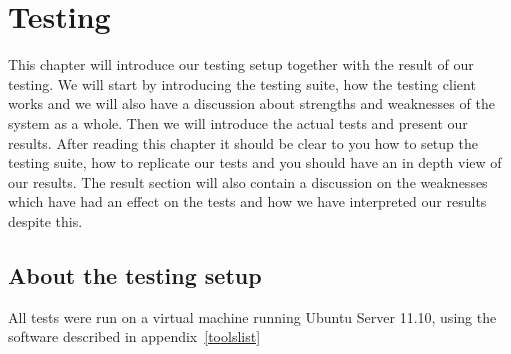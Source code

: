 \section{Testing}\label{Testing}
	This chapter will introduce our testing setup together with the result of our testing. We will start by introducing the testing suite, how the testing client works and we will also have a discussion about strengths and weaknesses of the system as a whole. Then we will introduce the actual tests and present our results. After reading this chapter it should be clear to you how to setup the testing suite, how to replicate our tests and you should have an in depth view of our results. The result section will also contain a discussion on the weaknesses which have had an effect on the tests and how we have interpreted our results despite this.
	    
    \subsection{About the testing setup}\label{Testing:About}
        All tests were run on a virtual machine running Ubuntu Server 11.10, using the software described in appendix~\ref{toolslist}
    	
 		
    	
    	
	

    

